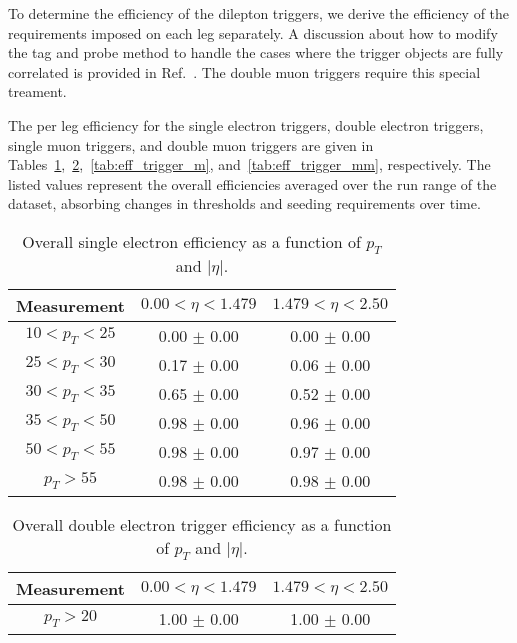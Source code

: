  
To determine the efficiency of the dilepton triggers, we derive the efficiency of the 
requirements imposed on each leg separately. A discussion about how to modify the
tag and probe method to handle the cases where the trigger objects are fully correlated
is provided in Ref.~\cite{HWW2011AN}. The double muon triggers require this special treament.

The per leg efficiency for the single electron triggers, double electron triggers,
single muon triggers, and double muon triggers are given in 
Tables~\ref{tab:eff_trigger_e},~\ref{tab:eff_trigger_ee},~\ref{tab:eff_trigger_m}, and~\ref{tab:eff_trigger_mm}, 
respectively. The listed values represent the overall efficiencies averaged over the run range
of the dataset, absorbing changes in thresholds and seeding requirements over time.
\vspace{10pt}
\begin{table}[!ht]
\begin{center}
\begin{tabular}{c|c|c}
\hline
Measurement  & $0.00<\eta<1.479$  & $1.479<\eta<2.50$  \\ 
\hline
$  10<p_T<  25$ & 0.00 $\pm$ 0.00  & 0.00 $\pm$ 0.00  \\ \hline 
$  25<p_T<  30$ & 0.17 $\pm$ 0.00  & 0.06 $\pm$ 0.00  \\ \hline 
$  30<p_T<  35$ & 0.65 $\pm$ 0.00  & 0.52 $\pm$ 0.00  \\ \hline 
$  35<p_T<  50$ & 0.98 $\pm$ 0.00  & 0.96 $\pm$ 0.00  \\ \hline 
$  50<p_T<  55$ & 0.98 $\pm$ 0.00  & 0.97 $\pm$ 0.00  \\ \hline 
$  p_T>     55$ & 0.98 $\pm$ 0.00  & 0.98 $\pm$ 0.00  \\ \hline 
\end{tabular}
\caption{Overall single electron efficiency as a function of $p_T$ and $|\eta|$.}
\label{tab:eff_trigger_e}
\end{center}
\end{table}
%
%
%
\begin{table}[!ht]
\begin{center}
\begin{tabular}{c|c|c}
\hline
Measurement  & $0.00<\eta<1.479$  & $1.479<\eta<2.50$  \\ 
\hline
$  p_T>     20$ & 1.00 $\pm$ 0.00  & 1.00 $\pm$ 0.00  \\ \hline 
\end{tabular}
\caption{Overall double electron trigger efficiency as a function of $p_T$ and $|\eta|$.}
\label{tab:eff_trigger_ee}
\end{center}
\end{table}
